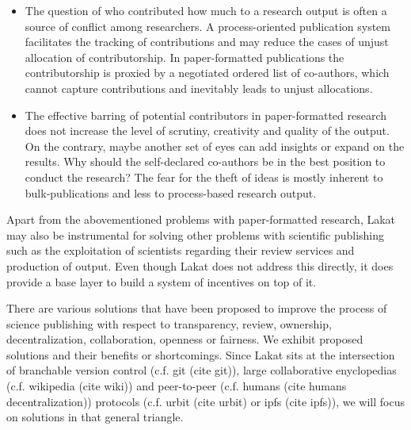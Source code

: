 \documentclass[14pt]{article}
\newcommand{\remark}[1]{{\color{purple} (#1)}}
\begin{document}
\begin{itemize}
\item 
The question of who contributed how much to a research output is often a source of conflict among researchers. A process-oriented publication system facilitates the tracking of contributions and may reduce the cases of unjust allocation of contributorship. In paper-formatted publications the contributorship is proxied by a negotiated ordered list of co-authors, which cannot capture contributions and inevitably leads to unjust allocations. 

\item The effective barring of potential contributors in paper-formatted research does not increase the level of scrutiny, creativity and quality of the output. On the contrary, maybe another set of eyes can add insights or expand on the results. Why should the self-declared co-authors be in the best position to conduct the research? The fear for the theft of ideas is mostly inherent to bulk-publications and less to process-based research output. 
\end{itemize}

Apart from the abovementioned problems with paper-formatted research, Lakat may also be instrumental for solving other problems with scientific publishing such as the exploitation of scientists regarding their review services and production of output. Even though Lakat does not address this directly, it does provide a base layer to build a system of incentives on top of it. 

There are various solutions that have been proposed to improve the process of science publishing with respect to transparency, review, ownership, decentralization, collaboration, openness or fairness. We exhibit proposed solutions and their benefits or shortcomings. Since Lakat sits at the intersection of branchable version control (c.f. git\cite{}\remark{cite git}), large collaborative enyclopedias (c.f. wikipedia\cite{}\remark{cite wiki}) and peer-to-peer (c.f. humans \cite{}\remark{cite humans decentralization}) protocols (c.f. urbit \cite{}\remark{cite urbit} or ipfs\cite{}\remark{cite ipfs}), we will focus on solutions in that general triangle.
\end{document}
